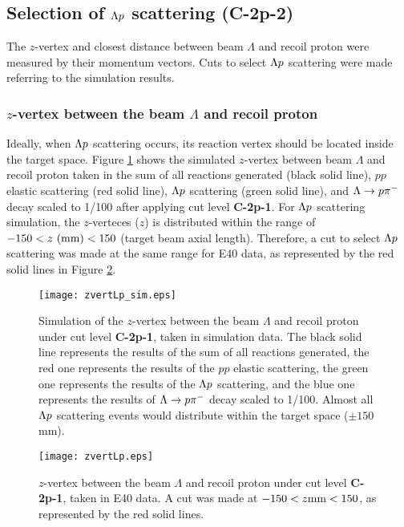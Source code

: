 

\clearpage
\subsection{Selection of $\Lambda p$ scattering ({\bf C-2p-2})}
The $z$-vertex and closest distance between beam $\Lambda$ and recoil proton were measured by their momentum vectors. Cuts to select $\Lambda p$ scattering were made referring to the simulation results. 

\subsubsection{$z$-vertex between the beam $\Lambda$ and recoil proton}

Ideally, when $\Lambda p$ scattering occurs, its reaction vertex should be located inside the target space. Figure \ref{fig-zvertLp_sim} shows the simulated $z$-vertex between beam $\Lambda$ and recoil proton taken in the sum of all reactions generated (black solid line), $pp$ elastic scattering (red solid line), $\Lambda p$ scattering (green solid line), and $\Lambda\to p\pi^{-}$ decay scaled to 1/100 after applying cut level {\bf C-2p-1}. For $\Lambda p$ scattering simulation, the $z$-verteces ($z$) is distributed within the range of $-150< z\ {\rm (mm)} <150$ (target beam axial length). Therefore, a cut to select $\Lambda p$ scattering was made at the same range for E40 data, as represented by the red solid lines in Figure \ref{fig-zvertLp}.

\begin{figure}[h]
  \centering
  \texttt{[image: zvertLp\_sim.eps]}
  \caption{Simulation of the $z$-vertex between the beam $\Lambda$ and recoil proton under cut level {\bf C-2p-1}, taken in simulation data. The black solid line represents the results of the sum of all reactions generated, the red one represents the results of the $pp$ elastic scattering, the green one represents the results of the $\Lambda p$ scattering, and the blue one represents the results of $\Lambda\to p\pi^{-}$ decay scaled to 1/100. Almost all $\Lambda p$ scattering events would distribute within the target space ($\pm150$ mm).}
  \label{fig-zvertLp_sim}
\end{figure}

\begin{figure}[h]
  \centering
  \texttt{[image: zvertLp.eps]}
  \caption{$z$-vertex between the beam $\Lambda$ and recoil proton under cut level {\bf C-2p-1}, taken in E40 data. A cut was made at $-150 < z {\rm mm} < 150$, as represented by the red solid lines.}
  \label{fig-zvertLp}
\end{figure}


